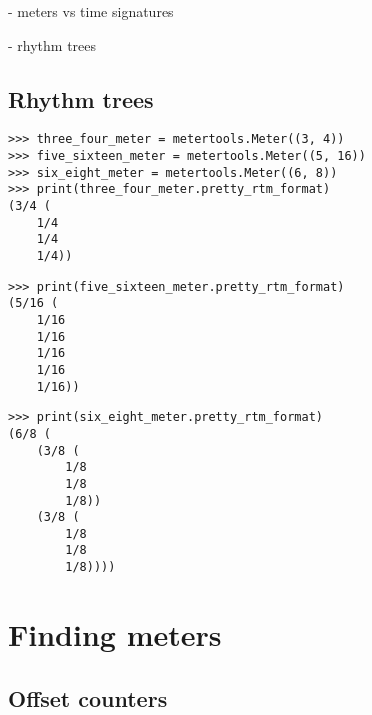 - meters vs time signatures

- rhythm trees

\subsection{Rhythm trees}

\begin{comment}
<abjad>
three_four_meter = metertools.Meter((3, 4))
five_sixteen_meter = metertools.Meter((5, 16))
six_eight_meter = metertools.Meter((6, 8))
print(three_four_meter.pretty_rtm_format)
print(five_sixteen_meter.pretty_rtm_format)
print(six_eight_meter.pretty_rtm_format)
</abjad>
\end{comment}

\begin{singlespacing}
\vspace{-0.5\baselineskip}
\begin{lstlisting}
>>> three_four_meter = metertools.Meter((3, 4))
>>> five_sixteen_meter = metertools.Meter((5, 16))
>>> six_eight_meter = metertools.Meter((6, 8))
>>> print(three_four_meter.pretty_rtm_format)
(3/4 (
	1/4
	1/4
	1/4))
\end{lstlisting}
\begin{lstlisting}
>>> print(five_sixteen_meter.pretty_rtm_format)
(5/16 (
	1/16
	1/16
	1/16
	1/16
	1/16))
\end{lstlisting}
\begin{lstlisting}
>>> print(six_eight_meter.pretty_rtm_format)
(6/8 (
	(3/8 (
		1/8
		1/8
		1/8))
	(3/8 (
		1/8
		1/8
		1/8))))
\end{lstlisting}
\end{singlespacing}

\section{Finding meters}

\subsection{Offset counters}

\begin{comment}
<abjad>
upper_staff = Staff("c'8 d'4. e'8 f'4.")
lower_staff = Staff(r'\clef bass c4 b,4 a,2')
piano_staff = scoretools.StaffGroup(
    [upper_staff, lower_staff],
    context_name='PianoStaff',
    )
show(piano_staff)
</abjad>
\end{comment}

